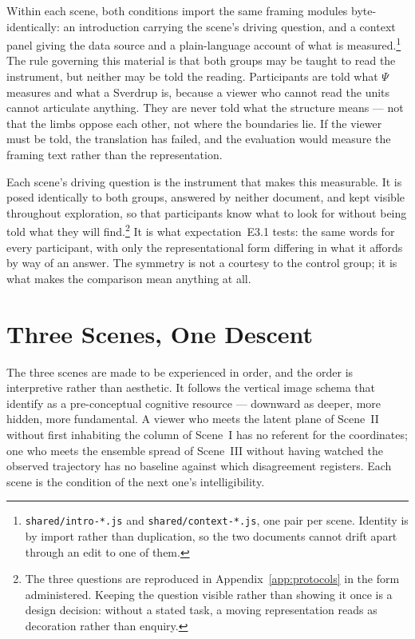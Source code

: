 Within each scene, both conditions import the same framing modules byte-identically: an introduction carrying the scene's driving question, and a context panel giving the data source and a plain-language account of what is measured.\footnote{\texttt{shared/intro-*.js} and \texttt{shared/context-*.js}, one pair per scene. Identity is by import rather than duplication, so the two documents cannot drift apart through an edit to one of them.} The rule governing this material is that both groups may be taught to read the instrument, but neither may be told the reading. Participants are told what $\Psi$ measures and what a Sverdrup is, because a viewer who cannot read the units cannot articulate anything. They are never told what the structure means --- not that the limbs oppose each other, not where the boundaries lie. If the viewer must be told, the translation has failed, and the evaluation would measure the framing text rather than the representation.
 
Each scene's driving question is the instrument that makes this measurable. It is posed identically to both groups, answered by neither document, and kept visible throughout exploration, so that participants know what to look for without being told what they will find.\footnote{The three questions are reproduced in Appendix~\ref{app:protocols} in the form administered. Keeping the question visible rather than showing it once is a design decision: without a stated task, a moving representation reads as decoration rather than enquiry.} It is what expectation~E3.1 tests: the same words for every participant, with only the representational form differing in what it affords by way of an answer. The symmetry is not a courtesy to the control group; it is what makes the comparison mean anything at all.
 
\section{Three Scenes, One Descent}
\label{sec:three-scenes}
 
The three scenes are made to be experienced in order, and the order is interpretive rather than aesthetic. It follows the vertical image schema that \citet{lakoff1999} identify as a pre-conceptual cognitive resource --- downward as deeper, more hidden, more fundamental. A viewer who meets the latent plane of Scene~II without first inhabiting the column of Scene~I has no referent for the coordinates; one who meets the ensemble spread of Scene~III without having watched the observed trajectory has no baseline against which disagreement registers. Each scene is the condition of the next one's intelligibility.
 
